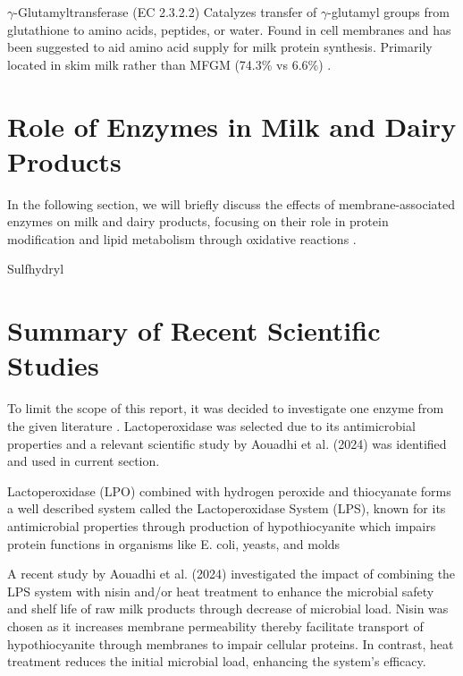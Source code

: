 \vline

$\gamma$-Glutamyltransferase (EC 2.3.2.2) Catalyzes transfer of $\gamma$-glutamyl groups from glutathione to amino acids, peptides, or water. Found in cell membranes and  has been suggested to aid amino acid supply for milk protein synthesis. Primarily located in skim milk rather than MFGM (74.3\% vs 6.6\%) \cite*{RM_01}.

\section{Role of Enzymes in Milk and Dairy Products}

In the following section, we will briefly discuss the effects of membrane-associated enzymes on milk and dairy products, focusing on their role in protein modification and lipid metabolism through oxidative reactions \cite{RM_01}.

\vline

Sulfhydryl 

\section{Summary of Recent Scientific Studies}
To limit the scope of this report, it was decided to investigate one enzyme from the given literature \cite*{RM_01}. Lactoperoxidase was selected due to its antimicrobial properties and a relevant scientific study by Aouadhi et al. (2024) was identified and used in current section. 

\vline

Lactoperoxidase (LPO) combined with hydrogen peroxide and thiocyanate forms a well described system called the Lactoperoxidase System (LPS), known for its antimicrobial properties through production of hypothiocyanite which impairs protein functions in organisms like E. coli, yeasts, and molds \cite*{RM_02}

\vline

A recent study by Aouadhi et al. (2024) investigated the impact of combining the LPS system with nisin and/or heat treatment to enhance the microbial safety and shelf life of raw milk products through decrease of microbial load. 
Nisin was chosen as it increases membrane permeability thereby facilitate transport of hypothiocyanite through membranes to impair cellular proteins. In contrast, heat treatment reduces the initial microbial load, enhancing the system's efficacy.

\vline

